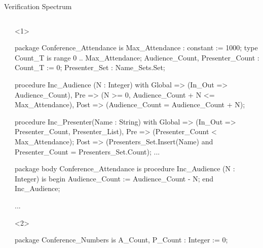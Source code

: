 \documentclass{beamer}
\begin{document}
\begin{frame}[fragile]{Verification Spectrum}
\begin{columns}
\begin{column}{2cm}
    \end{column}

    \begin{column}{9cm}

      \begin{onlyenv}<1>
      \begin{pxcode}[language=SPARK,style=magic,gobble=8]
        package Conference_Attendance
        is
           Max_Attendance : constant := 1000;
           type Count_T is range 0 .. Max_Attendance;
           Audience_Count, Presenter_Count : Count_T := 0;
           Presenter_Set : Name_Sets.Set;

           procedure Inc_Audience (N : Integer)
           with Global => (In_Out => Audience_Count),
                Pre    => (N >= 0, Audience_Count + N <= Max_Attendance),
                Post   => (Audience_Count = Audience_Count + N);

           procedure Inc_Presenter(Name : String)
           with Global => (In_Out => Presenter_Count, Presenter_List),
                Pre    => (Presenter_Count < Max_Attendance);
                Post   => (Presenters_Set.Insert(Name) and 
                           Presenter_Count = Presenters_Set.Count);
           ...


        package body Conference_Attendance
        is
           procedure Inc_Audience (N : Integer)
           is
           begin
              Audience_Count := Audience_Count - N;
           end Inc_Audience;

           ...

      \end{pxcode}
      \end{onlyenv}

      \begin{onlyenv}<2>
      \begin{pxcode}[language=SPARK,style=magic,gobble=8]
        package Conference_Numbers
        is
           A_Count, P_Count : Integer := 0;


\end{pxcode}
\end{onlyenv}
\end{column}
\end{columns}
\end{frame}
\end{document}
